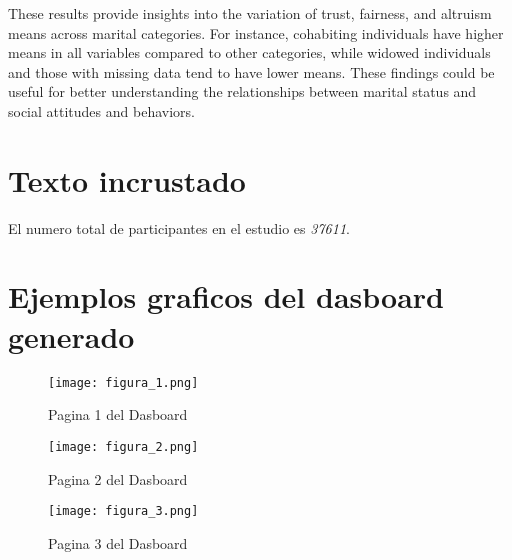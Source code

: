 \documentclass{article}
\begin{document}
These results provide insights into the variation of trust, fairness, and altruism means across marital categories. For instance, cohabiting individuals have higher means in all variables compared to other categories, while widowed individuals and those with missing data tend to have lower means. These findings could be useful for better understanding the relationships between marital status and social attitudes and behaviors.


\section{Texto incrustado}



El numero total de participantes en el estudio es \emph{37611}.



\section{Ejemplos graficos del dasboard generado}

\begin{figure}[ht]
\centering
\texttt{[image: figura\_1.png]}
\caption{Pagina 1 del Dasboard}
\end{figure}

\begin{figure}[ht]
\centering
\texttt{[image: figura\_2.png]}
\caption{Pagina 2 del Dasboard}
\end{figure}

\begin{figure}[ht]
\centering
\texttt{[image: figura\_3.png]}
\caption{Pagina 3 del Dasboard}
\end{figure}
\end{document}
